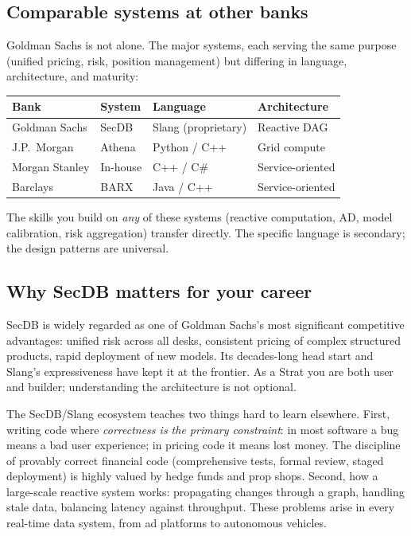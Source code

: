 \subsection{Comparable systems at other banks}

Goldman Sachs is not alone.  The major systems, each serving the
same purpose (unified pricing, risk, position management) but
differing in language, architecture, and maturity:

\begin{center}
\begin{tabular}{llll}
\toprule
\textbf{Bank} & \textbf{System} & \textbf{Language} & \textbf{Architecture} \\
\midrule
Goldman Sachs  & SecDB   & Slang (proprietary) & Reactive DAG \\
J.P.~Morgan    & Athena  & Python / C++        & Grid compute \\
Morgan Stanley & In-house & C++ / C\#           & Service-oriented \\
Barclays       & BARX    & Java / C++          & Service-oriented \\
\bottomrule
\end{tabular}
\end{center}

The skills you build on \emph{any} of these systems (reactive
computation, AD, model calibration, risk aggregation) transfer
directly.  The specific language is secondary; the design patterns
are universal.

\subsection{Why SecDB matters for your career}

SecDB is widely regarded as one of Goldman Sachs's most significant
competitive advantages: unified risk across all desks, consistent
pricing of complex structured products, rapid deployment of new
models.  Its decades-long head start and Slang's expressiveness have
kept it at the frontier.  As a Strat you are both user and builder;
understanding the architecture is not optional.

The SecDB/Slang ecosystem teaches two things hard to learn
elsewhere.  First, writing code where \emph{correctness is the
primary constraint}: in most software a bug means a bad user
experience; in pricing code it means lost money.  The discipline
of provably correct financial code (comprehensive tests, formal
review, staged deployment) is highly valued by hedge funds and
prop shops.  Second, how a large-scale reactive system works:
propagating changes through a graph, handling stale data,
balancing latency against throughput.  These problems arise in
every real-time data system, from ad platforms to autonomous
vehicles.

